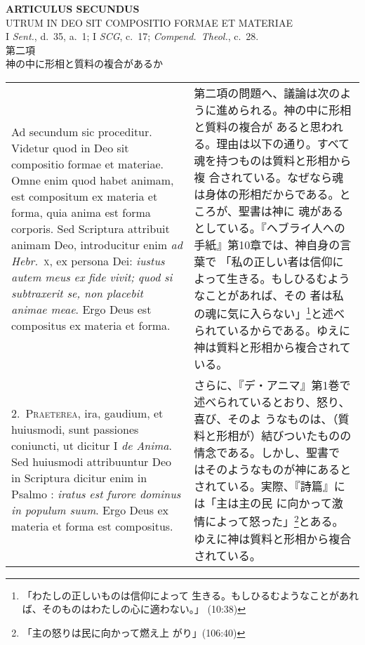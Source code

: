 \documentclass[10pt]{jsarticle}
\begin{document}
\newpage
{}

\begin{center}
 {\Large {\bf ARTICULUS SECUNDUS}}\\
 {\large UTRUM IN DEO SIT COMPOSITIO FORMAE ET MATERIAE}\\
 {\footnotesize I \textit{Sent.}, d.~35, a.~1; I \textit{SCG}, c.~17;
 \textit{Compend.~Theol.}, c.~28.}\\
 {\Large 第二項\\神の中に形相と質料の複合があるか}
\end{center}

\begin{longtable}{p{21em}p{21em}}

{\huge A}{\sc d secundum sic proceditur}. Videtur quod in Deo sit
compositio formae et materiae. Omne enim quod habet animam, est
compositum ex materia et forma, quia anima est forma corporis. Sed
Scriptura attribuit animam Deo, introducitur enim \textit{ad
Hebr.}~\textsc{x}, ex persona Dei: \textit{iustus autem meus ex fide
vivit; quod si subtraxerit se, non placebit animae meae}. Ergo Deus
est compositus ex materia et forma.


& 

第二項の問題へ、議論は次のように進められる。神の中に形相と質料の複合が
あると思われる。理由は以下の通り。すべて魂を持つものは質料と形相から複
合されている。なぜなら魂は身体の形相だからである。ところが、聖書は神に
魂があるとしている。『ヘブライ人への手紙』第10章では、神自身の言葉で
「私の正しい者は信仰によって生きる。もしひるむようなことがあれば、その
者は私の魂に気に入らない」\footnote{「わたしの正しいものは信仰によって
生きる。もしひるむようなことがあれば、そのものはわたしの心に適わない。」
(10:38)}と述べられているからである。ゆえに神は質料と形相から複合されて
いる。


\\


2.~\textsc{Praeterea}, ira, gaudium, et huiusmodi, sunt passiones
coniuncti, ut dicitur I \textit{de Anima}. Sed huiusmodi attribuuntur
Deo in Scriptura dicitur enim in Psalmo : \textit{iratus est furore
dominus in populum suum}. Ergo Deus ex materia et forma est
compositus.

& 


さらに、『デ・アニマ』第1巻で述べられているとおり、怒り、喜び、そのよ
うなものは、（質料と形相が）結びついたものの情念である。しかし、聖書で
はそのようなものが神にあるとされている。実際、『詩篇』には「主は主の民
に向かって激情によって怒った」\footnote{「主の怒りは民に向かって燃え上
がり」(106:40)}とある。ゆえに神は質料と形相から複合されている。


\end{longtable}
\end{document}
